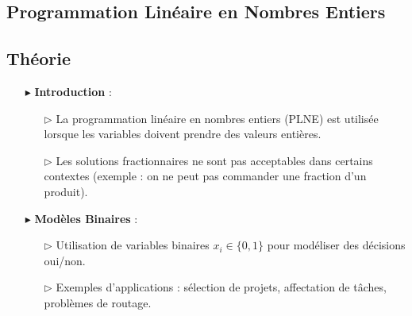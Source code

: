 \documentclass{report}
\begin{document}
\begin{multicols*}{2}
\chapter{Programmation Linéaire en Nombres Entiers}
\section{Théorie}
\begin{itemize}
    \item[$\blacktriangleright$] \textbf{Introduction} :
    \begin{itemize}
        \item[$\rhd$] La programmation linéaire en nombres entiers (PLNE) est utilisée lorsque les variables doivent prendre des valeurs entières.
        \item[$\rhd$] Les solutions fractionnaires ne sont pas acceptables dans certains contextes (exemple : on ne peut pas commander une fraction d'un produit).
    \end{itemize}

    \item[$\blacktriangleright$] \textbf{Modèles Binaires} :
    \begin{itemize}
        \item[$\rhd$] Utilisation de variables binaires \( x_i \in \{0, 1\} \) pour modéliser des décisions oui/non.
        \item[$\rhd$] Exemples d'applications : sélection de projets, affectation de tâches, problèmes de routage.
    \end{itemize}


\end{itemize}
\end{multicols*}
\end{document}
